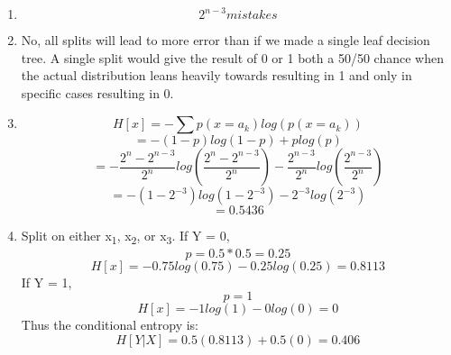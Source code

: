 \documentclass[11pt]{article}
\begin{document}
    \begin{enumerate}
        \item 
            \begin{equation}
                2^{n-3} mistakes
            \end{equation}
        \item No, all splits will lead to more error than if we made a single leaf decision tree. A single split would give the result of 0 or 1 both a 50/50 chance when the actual distribution leans heavily towards resulting in 1 and only in specific cases resulting in 0.
        \item 
            \begin{equation}
                H[x]=-\sum p(x=a_{k})log(p(x=a_{k}))
            \end{equation}
            \begin{equation}
                = -(1-p)log(1-p)+plog(p)
            \end{equation}
            \begin{equation}
                = -\frac{2^{n}-2^{n-3}}{2^{n}}log(\frac{2^{n}-2^{n-3}}{2^{n}}) - \frac{2^{n-3}}{2^{n}}log(\frac{2^{n-3}}{2^{n}})
            \end{equation}
            \begin{equation}
                = -(1-2^{-3})log(1-2^{-3}) - 2^{-3}log(2^{-3})
            \end{equation}
            \begin{equation}
                = 0.5436
            \end{equation}
        \item 
            Split on either x\textsubscript{1}, x\textsubscript{2}, or x\textsubscript{3}. If Y = 0,
            \begin{equation}
                p = 0.5 * 0.5 = 0.25
            \end{equation}
            \begin{equation}
                H[x]=-0.75log(0.75)-0.25log(0.25)=0.8113
            \end{equation}
            If Y = 1,
            \begin{equation}
                p = 1
            \end{equation}
            \begin{equation}
                H[x]=-1log(1)-0log(0) = 0
            \end{equation}
            Thus the conditional entropy is:
            \begin{equation}
                H[Y|X]=0.5(0.8113)+0.5(0)=0.406
            \end{equation}
    \end{enumerate}
\end{document}
